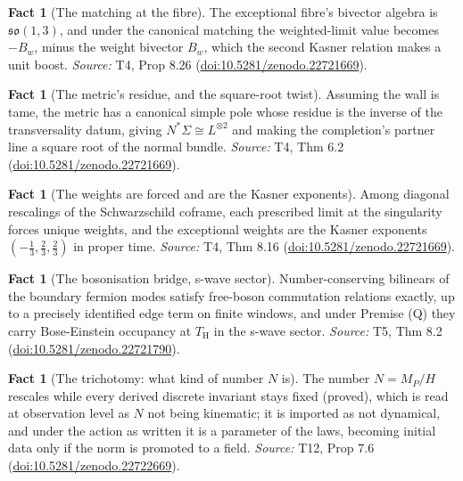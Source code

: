 \documentclass[11pt]{article}
\theoremstyle{definition}
\newtheorem{fact}[theorem]{Fact}
\theoremstyle{plain}
\newcommand{\changedmark}[2]{\marginpar{\raggedright\scriptsize\color{#1}#2}}
\providecommand{\Sig}{}\renewcommand{\Sig}{\Sigma}
\providecommand{\TH}{}\renewcommand{\TH}{T_{\mathrm{H}}}
\providecommand{\shL}{}\renewcommand{\shL}{L}
\begin{document}
\begin{fact}[The matching at the fibre]\label{c:sheaf.matching-fibre}
The exceptional fibre's bivector algebra is $\mathfrak{so}(1,3)$, and under the canonical matching the weighted-limit value becomes $-B_w$, minus the weight bivector $B_w$, which the second Kasner relation makes a unit boost.
\emph{Source:} T4, Prop 8.26 (\href{https://doi.org/10.5281/zenodo.22721669}{doi:10.5281/zenodo.22721669}).
\end{fact}

\begin{fact}[The metric's residue, and the square-root twist]\label{c:sheaf.metrics-residue-square-root-twist}
Assuming the wall is tame, the metric has a canonical simple pole whose residue is the inverse of the transversality datum, giving $N^*\Sig \cong \shL^{\otimes 2}$ and making the completion's partner line a square root of the normal bundle.
\emph{Source:} T4, Thm 6.2 (\href{https://doi.org/10.5281/zenodo.22721669}{doi:10.5281/zenodo.22721669}).
\end{fact}

\begin{fact}[The weights are forced and are the Kasner exponents]\label{c:sheaf.weights-are-forced-are-kasner-exponents}
Among diagonal rescalings of the Schwarzschild coframe, each prescribed limit at the singularity forces unique weights, and the exceptional weights are the Kasner exponents $(-\tfrac13, \tfrac23, \tfrac23)$ in proper time.
\emph{Source:} T4, Thm 8.16 (\href{https://doi.org/10.5281/zenodo.22721669}{doi:10.5281/zenodo.22721669}).
\end{fact}

\begin{fact}[The bosonisation bridge, s-wave sector]\label{c:singularity.bosonisation-bridge-s-wave-sector}
Number-conserving bilinears of the boundary fermion modes satisfy free-boson commutation relations exactly, up to a precisely identified edge term on finite windows, and under Premise (Q) they carry Bose-Einstein occupancy at $\TH$ in the s-wave sector.
\emph{Source:} T5, Thm 8.2 (\href{https://doi.org/10.5281/zenodo.22721790}{doi:10.5281/zenodo.22721790}).
\end{fact}

\begin{fact}[The trichotomy: what kind of number $N$ is]\label{c:standard-model.trichotomy-what-kind-number}
\changedmark{BrickRed}{corrected since the deposit}
The number $N = M_{P}/H$ rescales while every derived discrete invariant stays fixed (proved), which is read at observation level as $N$ not being kinematic; it is imported as not dynamical, and under the action as written it is a parameter of the laws, becoming initial data only if the norm is promoted to a field.
\emph{Source:} T12, Prop 7.6 (\href{https://doi.org/10.5281/zenodo.22722669}{doi:10.5281/zenodo.22722669}).
\end{fact}
\end{document}
